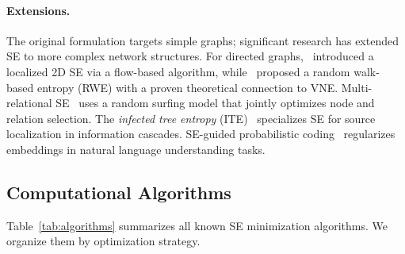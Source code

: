 \paragraph{Extensions.}
The original formulation targets simple graphs; significant research has
extended SE to more complex network structures.
For directed graphs,~\cite{yaopan2019flowDirected} introduced a localized 2D
SE via a flow-based algorithm, while~\cite{wxb2024rwedirected} proposed a
random walk-based entropy (RWE) with a proven theoretical connection to VNE.
Multi-relational SE~\cite{cao2024multi} uses a random surfing model that
jointly optimizes node and relation selection.
The \emph{infected tree entropy} (ITE)~\cite{wxb2023findingThesource}
specializes SE for source localization in information cascades.
SE-guided probabilistic coding~\cite{huang2024structuralProbCoding}
regularizes embeddings in natural language understanding tasks.

\subsection{Computational Algorithms}
\label{subsec:algorithms}

Table~\ref{tab:algorithms} summarizes all known SE minimization algorithms.
We organize them by optimization strategy.

